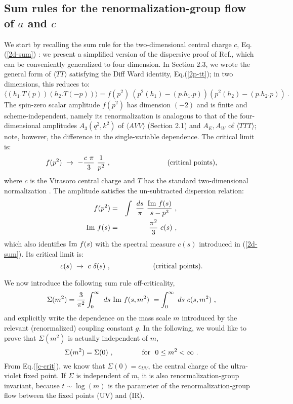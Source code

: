 \documentclass[11pt]{article}
\newcommand{\beq}{\begin{equation}}
\newcommand{\eeq}{\end{equation}}
\newcommand{\bea}{\begin{eqnarray}}
\newcommand{\eea}{\end{eqnarray}}
\def\Im{\hbox{\rm Im\ }}
\def\TTT{\bra TTT\ket}
\def\bra{\langle}
\def\ket{\rangle}
\begin{document}

\subsection{Sum rules for the renormalization-group flow of $a$ and $c$}

We start by recalling the  sum rule 
for the two-dimensional central charge $c$, Eq.(\ref{2d-sum}) \cite{sumrule}:
we present a simplified version of the dispersive proof
of Ref.\cite{cfl}, which can be conveniently generalized to four dimension.
In Section 2.3, we wrote the general form of $\bra TT \ket$ satisfying
the Diff Ward identity, Eq.(\ref{2p-tt}); in two dimensions, 
this reduces to:
\beq
\bra \left(h_1.T(p)\right) \left(h_2.T(-p)\right)\ket  
= f\left(p^2 \right)\ 
    \left(p^2 (h_1) - (p.h_1.p) \right) 
    \left(p^2 (h_2) - (p.h_2.p) \right) \ .
\label{2p-2d}
\eeq
The spin-zero scalar amplitude $f(p^2)$ has dimension $(-2)$ and is
finite and scheme-independent, namely its renormalization is analogous
to that of the four-dimensional amplitudes $A_3(q^2,k^2)$ of 
$\bra AVV\ket$ (Section 2.1) and $A_E, A_W$ of $\TTT$;
note, however, the difference in the single-variable dependence.
The critical limit is:
\beq
f(p^2) \ \to\ - \frac{c\ \pi}{3}\  \frac{1}{p^2}\ ,\qquad\qquad 
\qquad\qquad ({\rm critical\ points}),
\label{f-crit}
\eeq
where $c$ is the Virasoro central charge and $T$ has the standard
two-dimensional normalization  \cite{cfl}.
The amplitude satisfies the un-subtracted dispersion relation:
\bea
f(p^2) &=& \int \ \frac{ds}{\pi} \ {\Im f(s) \over s - p^2 }\ ,
\label{f-disp}\\
\Im f(s) &=& \frac{\pi^2}{3} \ c(s)\ , 
\label{c-id}
\eea
which also identifies $\Im f(s)$ with the 
spectral measure $c(s)$ introduced in (\ref{2d-sum}). 
Its critical limit is:
\beq
c(s)\ \to \ c\ \delta(s)  \ , \qquad\qquad\qquad ({\rm critical\ points}).
\label{c-crit}
\eeq

We now introduce the following sum rule off-criticality,
\beq
\Sigma(m^2) =  \frac{3}{\pi^2} \int_0^\infty \ ds \ \Im f(s,m^2) \ =
\int_0^\infty \ ds \ c(s,m^2)\ ,
\label{2d-sigma}
\eeq
and explicitly write the dependence on the mass scale $m$ introduced by
the relevant (renormalized) coupling constant $g$.
In the following, we would like to prove that
$\Sigma(m^2)$ is actually independent of $m$, 
\beq
\Sigma(m^2) = \Sigma(0)\ ,\qquad \qquad {\rm for}\ \ 0\le m^2 <\infty\ .
\label{m-ind}
\eeq
From Eq.(\ref{c-crit}), we know that $\Sigma(0)= c_{UV}$, 
the central charge of the ultra-violet fixed point.
If $\Sigma$ is independent of $m$, it is also 
renormalization-group invariant, because $t\sim\log(m)$ is the parameter 
of the renormalization-group flow between the fixed points
(UV) and (IR).
\end{document}
